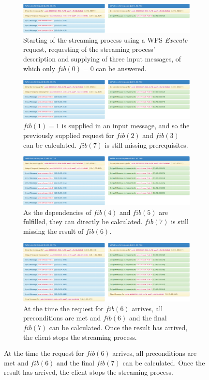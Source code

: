 		\begin{figure}
			\centering
			\begin{subfigure}{\textwidth}
				\caption{Starting of the streaming process using a WPS \emph{Execute} request, requesting of the streaming process' description and supplying of three input messages, of which only $fib(0) = 0$ can be answered.}
				\includegraphics[width=\textwidth]{figures/fibonacci-1.png}
			\end{subfigure}
			\begin{subfigure}{\textwidth}
				\caption{$fib(1) = 1$ is supplied in an input message, and so the previously supplied request for $fib(2)$ and $fib(3)$ can be calculated. $fib(7)$ is still missing prerequisites.}
				\includegraphics[width=\textwidth]{figures/fibonacci-2.png}
			\end{subfigure}
			\begin{subfigure}{\textwidth}
				\caption{As the dependencies of $fib(4)$ and $fib(5)$ are fulfilled, they can directly be calculated. $fib(7)$ is still missing the result of $fib(6)$.}
				\includegraphics[width=\textwidth]{figures/fibonacci-3.png}
			\end{subfigure}
			\begin{subfigure}{\textwidth}
				\caption{At the time the request for $fib(6)$ arrives, all preconditions are met and $fib(6)$ and the final $fib(7)$ can be calculated. Once the result has arrived, the client stops the streaming process.}
				\includegraphics[width=\textwidth]{figures/fibonacci-4.png}

\end{subfigure}
\end{figure}
